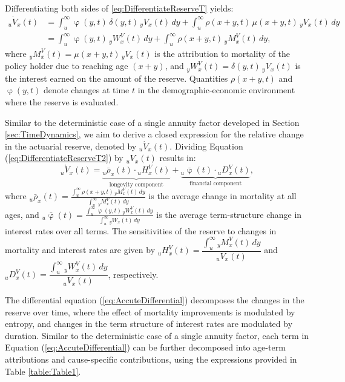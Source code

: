 \documentclass[12pt]{article}
\begin{document}
{Differentiating both sides of \eqref{eq:DifferentiateReserveT} yields:
\begin{equation}\label{eq:DifferentiateReserveT2}
	\begin{split}
		{}_u\dot{V}_x(t) &= \int_u^\infty \upvarphi(y,t) \, \delta(y,t) \, {}_yV_x(t) \, dy + \int_u^\infty \rho(x+y,t) \, \mu(x+y,t) \, {}_yV_x(t) \, dy \\ 
		&= \int_u^\infty \upvarphi(y,t) \, {}_yW^V_x(t) \, dy + \int_u^\infty \rho(x+y,t) \, {}_yM^V_x(t) \, dy,
	\end{split}
\end{equation}
where ${}_yM^V_x(t) = \mu(x+y,t) \, {}_yV_x(t)$ is the attribution to mortality of the policy holder due to reaching age $(x+y)$, and ${}_yW^V_x(t) = \delta(y,t) \, {}_yV_x(t)$ is the interest earned on the amount of the reserve. Quantities $\rho(x+y,t)$ and $\upvarphi(y,t)$ denote changes at time $t$ in the demographic-economic environment where the reserve is evaluated. 


Similar to the deterministic case of a single annuity factor developed in Section \ref{sec:TimeDynamics}, we aim to derive a closed expression for the relative change in the actuarial reserve, denoted by ${}_u\acute{V}_x(t)$. Dividing Equation (\ref{eq:DifferentiateReserveT2}) by ${}_uV_x(t)$ results in:
\begin{equation}\label{eq:AccuteDifferential}
	{}_u\acute{V}_x(t) = \underbrace{{}_u\bar{\rho}_x(t) \cdot {}_uH_x^V(t)}_\text{longevity component} + \underbrace{{}_u\bar{\upvarphi}(t) \cdot {}_uD_x^V(t)}_\text{financial component},
\end{equation}
where ${}_u\bar{\rho}_x(t) = \frac{\int_u^\infty \rho(x+y,t) \, {}_yM^V_x(t) \, dy}{\int_u^\infty {}_yM^V_x(t) \, dy}$ is the average change in mortality at all ages, and ${}_u\bar{\upvarphi}(t) = \frac{\int_u^\infty \upvarphi(y,t) \, {}_yW^V_x(t) \, dy}{\int_u^\infty {}_yW_x(t) \, dy}$ is the average term-structure change in interest rates over all terms. The sensitivities of the reserve to changes in mortality and interest rates are given by ${}_uH_x^V(t) = \dfrac{\int_{u}^{\infty} {}_yM^V_x(t) \, dy}{{}_uV_x(t)}$ and ${}_uD_x^V(t) = \dfrac{\int_{u}^{\infty} {}_yW^V_x(t) \, dy}{{}_uV_x(t)}$, respectively.

The differential equation (\ref{eq:AccuteDifferential}) decomposes the changes in the reserve over time, where the effect of mortality improvements is modulated by entropy, and changes in the term structure of interest rates are modulated by duration. Similar to the deterministic case of a single annuity factor, each term in Equation (\ref{eq:AccuteDifferential}) can be further decomposed into age-term attributions and cause-specific contributions, using the expressions provided in Table \ref{table:Table1}.



}
\end{document}
